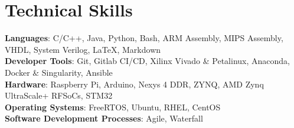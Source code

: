 \documentclass[letterpaper,11pt]{article}
\makeatletter
\newcommand{\resumeItem}[1]{
  \item\small{
    {#1 \vspace{-2pt}}
  }
}
\newcommand{\resumeProjectHeading}[2]{
    \item
    \begin{tabular*}{0.97\textwidth}{l@{\extracolsep{\fill}}r}
      \small#1 & #2 \\
    \end{tabular*}\vspace{-7pt}
}
\newcommand{\resumeSubHeadingListEnd}{\end{itemize}}
\newcommand{\resumeItemListStart}{\begin{itemize}}
\newcommand{\resumeItemListEnd}{\end{itemize}\vspace{-5pt}}
\makeatother
\begin{document}



\section{Technical Skills}
 \begin{itemize}[leftmargin=0.15in, label={}]
    \small{\item{
    \textbf{Languages}{: C/C++, Java, Python, Bash, ARM Assembly, MIPS Assembly, VHDL, System Verilog, LaTeX, Markdown} \\
     \textbf{Developer Tools}{: Git, Gitlab CI/CD, Xilinx Vivado \& Petalinux, Anaconda, Docker \& Singularity, Ansible} \\
     \textbf{Hardware}{: Raspberry Pi, Arduino, Nexys 4 DDR, ZYNQ, AMD Zynq UltraScale+ RFSoCs, STM32} \\
	\textbf{Operating Systems}{: FreeRTOS, Ubuntu, RHEL, CentOS} \\
  \textbf{Software Development Processes}{: Agile, Waterfall} \\
        }}
 \end{itemize}

\end{document}
